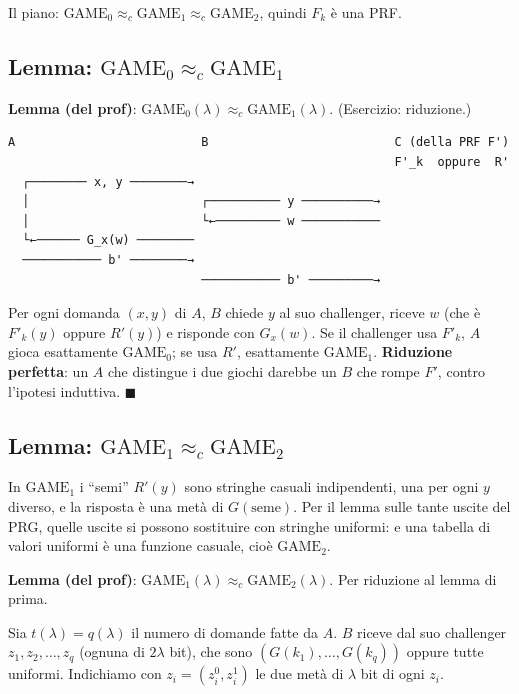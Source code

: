 Il piano: \(\text{GAME}_0 \approx_c \text{GAME}_1 \approx_c \text{GAME}_2\), quindi \(F_k\) è una PRF.

\subsection{Lemma: \texorpdfstring{\(\text{GAME}_0 \approx_c \text{GAME}_1\)}{GAME0 ≈c GAME1}}

\textbf{Lemma (del prof)}: \(\text{GAME}_0(\lambda) \approx_c \text{GAME}_1(\lambda)\). (Esercizio: riduzione.)

\begin{verbatim}
A                          B                          C (della PRF F')
                                                      F'_k  oppure  R'
  ┌──────── x, y ────────→
  │                        ┌────────── y ──────────→
  │                        └←───────── w ───────────
  └←────── G_x(w) ────────
  ─────────── b' ────────→
                           ─────────── b' ─────────→
\end{verbatim}

Per ogni domanda \((x, y)\) di \(A\), \(B\) chiede \(y\) al suo challenger, riceve \(w\) (che è \(F'_k(y)\) oppure \(R'(y)\)) e risponde con \(G_x(w)\). Se il challenger usa \(F'_k\), \(A\) gioca esattamente \(\text{GAME}_0\); se usa \(R'\), esattamente \(\text{GAME}_1\). \textbf{Riduzione perfetta}: un \(A\) che distingue i due giochi darebbe un \(B\) che rompe \(F'\), contro l'ipotesi induttiva. \(\blacksquare\)

\subsection{Lemma: \texorpdfstring{\(\text{GAME}_1 \approx_c \text{GAME}_2\)}{GAME1 ≈c GAME2}}

\begin{inbreve}
In \(\text{GAME}_1\) i ``semi'' \(R'(y)\) sono stringhe casuali indipendenti, una per ogni \(y\) diverso, e la risposta è una metà di \(G(\text{seme})\). Per il lemma sulle tante uscite del PRG, quelle uscite si possono sostituire con stringhe uniformi: e una tabella di valori uniformi è una funzione casuale, cioè \(\text{GAME}_2\).
\end{inbreve}

\textbf{Lemma (del prof)}: \(\text{GAME}_1(\lambda) \approx_c \text{GAME}_2(\lambda)\). Per riduzione al lemma di prima.

Sia \(t(\lambda) = q(\lambda)\) il numero di domande fatte da \(A\). \(B\) riceve dal suo challenger \(z_1, z_2, \dots, z_q\) (ognuna di \(2\lambda\) bit), che sono \((G(k_1), \dots, G(k_q))\) oppure tutte uniformi. Indichiamo con \(z_i = (z_i^0, z_i^1)\) le due metà di \(\lambda\) bit di ogni \(z_i\).

